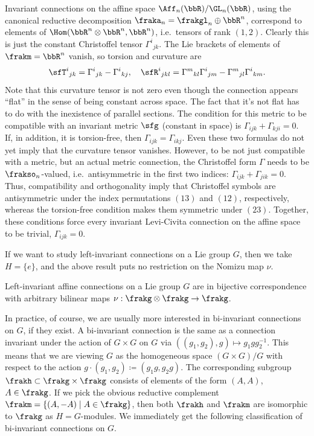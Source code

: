 \begin{example}
    Invariant connections on the affine space $\Aff_n(\bbR)\slash \GL_n(\bbR)$, using the canonical reductive decomposition $\fraka_n=\frakgl_n\oplus \bbR^n$, correspond to elements of $\Hom(\bbR^n\otimes \bbR^n,\bbR^n)$, i.e.\ tensors of rank $(1,2)$. Clearly this is just the constant Christoffel tensor $\Gamma^i{}_{jk}$. The Lie brackets of elements of $\frakm=\bbR^n$ vanish, so torsion and curvature are 
    \[\sfT^i{}_{jk}=\Gamma^i{}_{jk}-\Gamma^i{}_{kj},\quad \sfR^i{}_{jkl}=\Gamma^m{}_{kl}\Gamma^i{}_{jm}-\Gamma^m{}_{jl}\Gamma^i{}_{km}.\] 
    Note that this curvature tensor is not zero even though the connection appears ``flat'' in the sense of being constant across space. The fact that it's not flat has to do with the inexistence of parallel sections. The condition for this metric to be compatible with an invariant metric $\sfg$ (constant in space) is $\Gamma_{ijk}+\Gamma_{kji}=0$. If, in addition, it is torsion-free, then $\Gamma_{ijk}=\Gamma_{ikj}$. Even these two formulas do not yet imply that the curvature tensor vanishes. However, to be not just compatible with a metric, but an actual metric connection, the Christoffel form $\Gamma$ needs to be $\frakso_n$-valued, i.e.\ antisymmetric in the first two indices: $\Gamma_{ijk}+\Gamma_{jik}=0$. Thus, compatibility and orthogonality imply that Christoffel symbols are antisymmetric under the index permutations $(13)$ and $(12)$, respectively, whereas the torsion-free condition makes them symmetric under $(23)$. Together, these conditions force every invariant Levi-Civita connection on the affine space to be trivial, $\Gamma_{ijk}=0$.
\end{example}

If we want to study left-invariant connections on a Lie group $G$, then we take $H=\{e\}$, and the above result puts no restriction on the Nomizu map $\nu$.

\begin{cor}
    Left-invariant affine connections on a Lie group $G$ are in bijective correspondence with arbitrary bilinear maps $\nu:\frakg\otimes\frakg\to \frakg$.
\end{cor}

In practice, of course, we are usually more interested in bi-invariant connections on $G$, if they exist. A bi-invariant connection is the same as a connection invariant under the action of $G\times G$ on $G$ via $((g_1,g_2),g)\mapsto g_1gg_2^{-1}$. This means that we are viewing $G$ as the homogeneous space $(G\times G)\slash G$ with respect to the action $g\cdot (g_1,g_2)\coloneqq (g_1g,g_2g)$. The corresponding subgroup $\frakh\subset\frakg\times\frakg$ consists of elements of the form $(A,A)$, $A\in\frakg$. If we pick the obvious reductive complement $\frakm=\{(A,-A)\mid A\in\frakg\}$, then both $\frakh$ and $\frakm$ are isomorphic to $\frakg$ as $H=G$-modules. We immediately get the following classification of bi-invariant connections on $G$.

